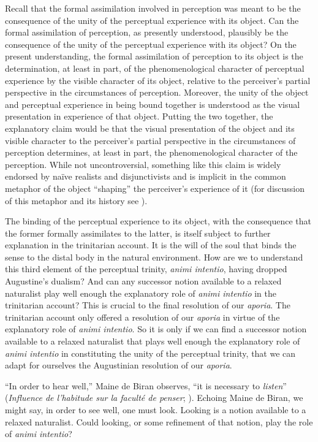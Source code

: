 \documentclass[12pt]{article}
\begin{document}
Recall that the formal assimilation involved in perception was meant to be the consequence of the unity of the perceptual experience with its object. Can the formal assimilation of perception, as presently understood, plausibly be the consequence of the unity of the perceptual experience with its object? On the present understanding, the formal assimilation of perception to its object is the determination, at least in part, of the phenomenological character of perceptual experience by the visible character of its object, relative to the perceiver's partial perspective in the circumstances of perception. Moreover, the unity of the object and perceptual experience in being bound together is understood as the visual presentation in experience of that object. Putting the two together, the explanatory claim would be that the visual presentation of the object and its visible character to the perceiver's partial perspective in the circumstances of perception determines, at least in part, the phenomenological character of the perception. While not uncontroversial, something like this claim is widely endorsed by na\"{i}ve realists and disjunctivists and is implicit in the common metaphor of the object ``shaping'' the perceiver's experience of it (for discussion of this metaphor and its history see \citealt[chapter 9]{Kalderon:2015fr}).

The binding of the perceptual experience to its object, with the consequence that the former formally assimilates to the latter, is itself subject to further explanation in the trinitarian account. It is the will of the soul that binds the sense to the distal body in the natural environment. How are we to understand this third element of the perceptual trinity, \emph{animi intentio}, having dropped Augustine's dualism? And can any successor notion available to a relaxed naturalist play well enough the explanatory role of \emph{animi intentio} in the trinitarian account? This is crucial to the final resolution of our \emph{aporia}. The trinitarian account only offered a resolution of our \emph{aporia} in virtue of the explanatory role of \emph{animi intentio}. So it is only if we can find a successor notion available to a relaxed naturalist that plays well enough the explanatory role of \emph{animi intentio} in constituting the unity of the perceptual trinity, that we can adapt for ourselves the Augustinian resolution of our \emph{aporia}.

``In order to hear well,'' Maine de Biran observes, ``it is necessary to \emph{listen}'' (\emph{Influence de l'habitude sur la faculté de penser}; \citealt[63--4]{Boehm:1929aa}). Echoing Maine de Biran, we might say, in order to see well, one must look. Looking is a notion available to a relaxed naturalist. Could looking, or some refinement of that notion, play the role of \emph{animi intentio}?
\end{document}
